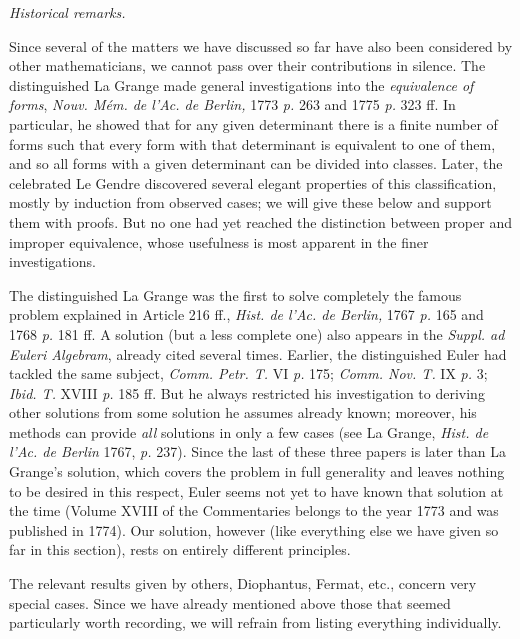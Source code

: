 \begin{center}
\textit{Historical remarks.}
\end{center}

Since several of the matters we have discussed so far have also been considered by other mathematicians, we cannot pass over their contributions in silence. The distinguished La Grange made general investigations into the \textit{equivalence of forms}, \textit{Nouv. M\'em. de l'Ac. de Berlin,} 1773 \textit{p.} 263 and 1775 \textit{p.} 323 ff. In particular, he showed that for any given determinant there is a finite number of forms such that every form with that determinant is equivalent to one of them, and so all forms with a given determinant can be divided into classes. Later, the celebrated Le Gendre discovered several elegant properties of this classification, mostly by induction from observed cases; we will give these below and support them with proofs. But no one had yet reached the distinction between proper and improper equivalence, whose usefulness is most apparent in the finer investigations.

The distinguished La Grange was the first to solve completely the famous problem explained in Article 216 ff., \textit{Hist. de l'Ac. de Berlin,} 1767 \textit{p.} 165 and 1768 \textit{p.} 181 ff. A solution (but a less complete one) also appears in the \textit{Suppl. ad Euleri Algebram}, already cited several times. Earlier, the distinguished Euler had tackled the same subject, \textit{Comm. Petr. T.} VI \textit{p.} 175; \textit{Comm. Nov. T.} IX \textit{p.} 3; \textit{Ibid. T.} XVIII \textit{p.} 185 ff. But he always restricted his investigation to deriving other solutions from some solution he assumes already known; moreover, his methods can provide \textit{all} solutions in only a few cases (see La Grange, \textit{Hist. de l'Ac. de Berlin} 1767, \textit{p.} 237). Since the last of these three papers is later than La Grange's solution, which covers the problem in full generality and leaves nothing to be desired in this respect, Euler seems not yet to have known that solution at the time (Volume XVIII of the Commentaries belongs to the year 1773 and was published in 1774). Our solution, however (like everything else we have given so far in this section), rests on entirely different principles.

The relevant results given by others, Diophantus, Fermat, etc., concern very special cases. Since we have already mentioned above those that seemed particularly worth recording, we will refrain from listing everything individually.


